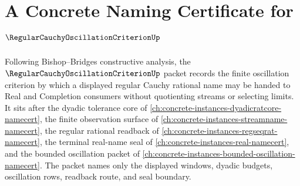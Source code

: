 \chapter{A Concrete Naming Certificate for $\RegularCauchyOscillationCriterionUp$}
\label{ch:concrete-instances-regular-cauchy-oscillation-criterion-namecert}

Following Bishop--Bridges constructive analysis, the $\RegularCauchyOscillationCriterionUp$ packet records the finite oscillation criterion by which a displayed regular Cauchy rational name may be handed to Real and Completion consumers without quotienting streams or selecting limits. It sits after the dyadic tolerance core of \autoref{ch:concrete-instances-dyadicratcore-namecert}, the finite observation surface of \autoref{ch:concrete-instances-streamname-namecert}, the regular rational readback of \autoref{ch:concrete-instances-regseqrat-namecert}, the terminal real-name seal of \autoref{ch:concrete-instances-real-namecert}, and the bounded oscillation packet of \autoref{ch:concrete-instances-bounded-oscillation-namecert}. The packet names only the displayed windows, dyadic budgets, oscillation rows, readback route, and seal boundary.

